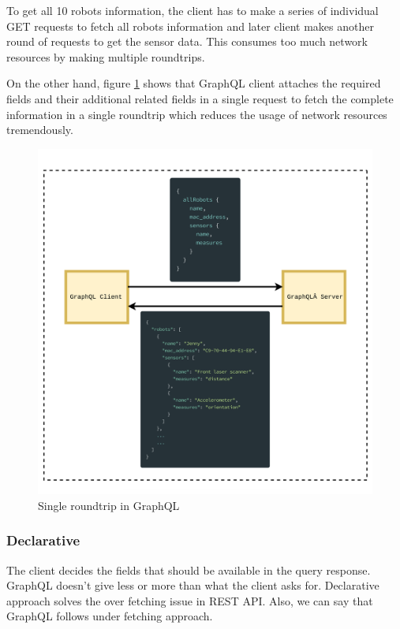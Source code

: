   To get all 10 robots information, the client has to make a series of individual GET requests to fetch all robots information and later client makes another round of requests to get the sensor data. This consumes too much network resources by making multiple roundtrips.
 
 	On the other hand, figure \ref{fig:graphql_roundtrip} shows that GraphQL client attaches the required fields and their additional related fields in a single request to fetch the complete information in a single roundtrip which reduces the usage of network resources tremendously.  
	
	\begin{figure}[!htbp] 
		\begin{center}
			\includegraphics[trim={0 0 0 2cm},clip,scale=0.09]{./images/png/graphql_roundtrip}	
			\caption{Single roundtrip in GraphQL}	
			\label{fig:graphql_roundtrip}	
		\end{center}
	\end{figure}

	\subsubsection{Declarative}
	The client decides the fields that should be available in the query response. GraphQL doesn't give less or more than what the client asks for.  Declarative approach solves the over fetching issue in REST API. Also, we can say that GraphQL follows under fetching approach. 
	
